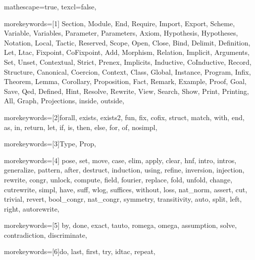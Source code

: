
 {

mathescape=true,						
texcl=false,


morekeywords=[1]{
Section, Module, End, Require, Import, Export, Scheme, %
Variable, Variables, Parameter, Parameters, Axiom, Hypothesis, Hypotheses,
Notation, Local, Tactic, Reserved, Scope, Open, Close, Bind, Delimit,
Definition, Let, Ltac, Fixpoint, CoFixpoint, Add, Morphism, Relation,
Implicit, Arguments, Set, Unset, Contextual, Strict, Prenex, Implicits,
Inductive, CoInductive, Record, Structure, Canonical, Coercion,
Context, Class, Global, Instance, Program, Infix,
Theorem, Lemma, Corollary, Proposition, Fact, Remark, Example,
Proof, Goal, Save, Qed, Defined, Hint, Resolve, Rewrite, View,
Search, Show, Print, Printing, All, Graph, Projections, inside, outside},

morekeywords=[2]{forall, exists, exists2, fun, fix, cofix, struct,
      match, with, end, as, in, return, let, if, is, then, else,
      for, of, nosimpl},

morekeywords=[3]{Type, Prop},

morekeywords=[4]{
         pose, set, move, case, elim, apply, clear,
            hnf, intro, intros, generalize, pattern, after, %
	    destruct, induction, using, refine, inversion, injection,
         rewrite, congr, unlock, compute, field, fourier,
            replace, fold, unfold, change, cutrewrite, simpl,
         have, suff, wlog, suffices, without, loss, nat_norm,
            assert, cut, trivial, revert, bool_congr, nat_congr,
	 symmetry, transitivity, auto, split, left, right, autorewrite},        

morekeywords=[5]{
         by, done, exact, tauto, romega, omega,
         assumption, solve, contradiction, discriminate},


morekeywords=[6]{do, last, first, try, idtac, repeat},

}

